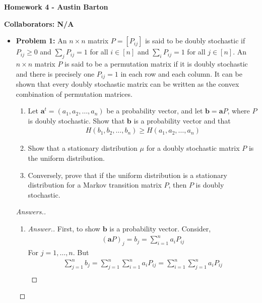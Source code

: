 \documentclass[10pt,twoside]{article}
\begin{document}
\begin{center}
\huge{\bf{Homework 4} - Austin Barton}
\end{center}

\medskip

\noindent \large{\textbf{Collaborators: N/A}}

\medskip

\begin{itemize}
    \item\textbf{Problem 1:} \newline
    \noindent\makebox[\linewidth]{\rule{18cm}{0.4pt}}
    An $n\times n$ matrix $P = [P_{ij}]$ is said to be doubly stochastic if $P_{ij}\geq 0$ and $\sum_{j}P_{ij} = 1$ for all $i\in [n]$ and $\sum_{i}P_{ij} = 1$ for all $j\in [n]$. An $n\times n$ matrix $P$ is said to be a permutation matrix if it is doubly stochastic and there is precisely one $P_{ij} = 1$ in each row and each column. It can be shown that every doubly stochastic matrix can be written as the convex combination of permutation matrices.
    \begin{enumerate}
        \item Let $\mathbf{a}^t = (a_1, a_2, \ldots, a_n)$ be a probability vector, and let $\mathbf{b} = \mathbf{a}P$, where $P$ is doubly stochastic. Show that $\mathbf{b}$ is a probability vector and that 
        \begin{gather*}
            H(b_1, b_2, \ldots, b_n)\geq H(a_1, a_2, \ldots, a_n)
        \end{gather*}
        \item Show that a stationary distribution $\mu$ for a doubly stochastic matrix $P$ is the uniform distribution.
        \item Conversely, prove that if the uniform distribution is a stationary distribution for a Markov transition matrix $P$, then $P$ is doubly stochastic.
    \end{enumerate}
    \begin{proof}[Answers.]
    \begin{enumerate}
        \item \begin{proof}[Answer.]
            First, to show $\mathbf{b}$ is a probability vector. Consider,
            \begin{gather*}
                (\mathbf{a}P)_j = b_j = \sum_{i=1}^n a_iP_{ij}
            \end{gather*}
            For $j=1,\ldots, n$. But \begin{gather*}
                \sum_{j=1}^n b_j = \sum_{j=1}^n   \sum_{i=1}^n a_iP_{ij} = \sum_{i=1}^n\sum_{j=1}^n a_iP_{ij} \\

\end{gather*}
\end{proof}
\end{enumerate}
\end{proof}
\end{itemize}
\end{document}
